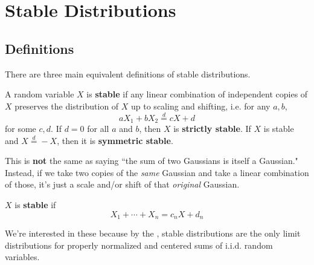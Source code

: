 \documentclass[twoside,10pt]{report}
\begin{document}
\tableofcontents




\chapter{Stable Distributions}

\section{Definitions}

There are three main equivalent definitions of stable distributions.

\begin{defn}[]
A random variable $X$ is \textbf{stable} if any linear combination of independent copies of $X$ preserves the distribution of $X$ up to scaling and shifting, i.e. for any $a,b$,
\[
a X_1 + b X_2 \stackrel{d}{=} c X + d
\] for some $c,d$. If $d=0$ for all $a$ and $b$, then $X$ is \textbf{strictly stable}. If $X$ is stable and $X \stackrel{d}{=} -X$, then it is \textbf{symmetric stable}.
\end{defn}

This is \textbf{not} the same as saying ``the sum of two Gaussians is itself a Gaussian." Instead, if we take two copies of the \emph{same} Gaussian and take a linear combination of those, it's just a scale and/or shift of that \emph{original} Gaussian.

\begin{defn}[]
$X$ is \textbf{stable} if
\[
X_1 + \cdots + X_{n} = c_{n}X + d_{n}
\] 

\end{defn}

We're interested in these because by the , stable distributions are the only limit distributions for properly normalized and centered sums of i.i.d. random variables.


\end{document}
